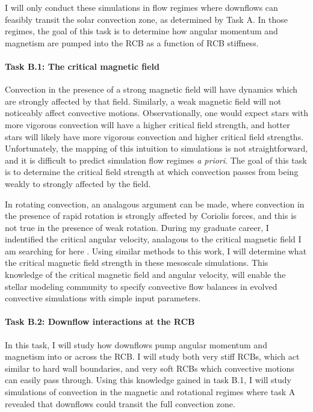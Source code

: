 \documentclass[11pt, preprint]{aastex}
\begin{document}
I will only conduct these simulations in flow regimes where downflows can feasibly transit the solar convection zone, as determined by Task A.
In those regimes, the goal of this task is to determine how angular momentum and magnetism are pumped into the RCB as a function of RCB stiffness.

\paragraph{Task B.1: The critical magnetic field}
\label{sct:taskB1}
Convection in the presence of a strong magnetic field will have dynamics which are strongly affected by that field.
Similarly, a weak magnetic field will not noticeably affect convective motions.
Observationally, one would expect stars with more vigorous convection will have a higher critical field strength, and hotter stars will likely have more vigorous convection and higher critical field strengths.
Unfortunately, the mapping of this intuition to simulations is not straightforward, and it is difficult to predict simulation flow regimes \emph{a priori}.
The goal of this task is to determine the critical field strength at which convection passes from being weakly to strongly affected by the field.

In rotating convection, an analagous argument can be made, where convection in the presence of rapid rotation is strongly affected by Coriolis forces, and this is not true in the presence of weak rotation.
During my graduate career, I indentified the critical angular velocity, analagous to the critical magnetic field I am searching for here \citep[][and Fig. \ref{fig:rossby_plot}]{anders&all2019}.
Using similar methods to this work, I will determine what the critical magnetic field strength in these mesoscale simulations.
This knowledge of the critical magnetic field and angular velocity, will enable the stellar modeling community to specify convective flow balances in evolved convective simulations with simple input parameters.

\paragraph{Task B.2: Downflow interactions at the RCB}
\label{sct:taskB2}
In this task, I will study how downflows pump angular momentum and magnetism into or across the RCB.
I will study both very stiff RCBs, which act similar to hard wall boundaries, and very soft RCBs which convective motions can easily pass through.
Using this knowledge gained in task B.1, I will study simulations of convection in the magnetic and rotational regimes where task A revealed that downflows could transit the full convection zone.
\end{document}
